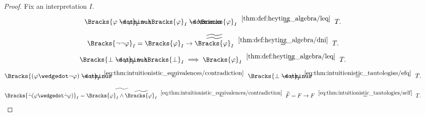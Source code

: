\begin{proof}
  Fix an interpretation \( I \).

  \begin{equation*}
    \Bracks{\varphi \synimplies \varphi}_I
    =
    \Bracks{\varphi}_I \synimplies \Bracks{\varphi}_I
    \reloset {\ref{thm:def:heyting_algebra/leq}} =
    T.
  \end{equation*}

  \begin{equation*}
    \Bracks{\neg \neg \varphi}_I
    =
    \Bracks{\varphi}_I \rightarrow \widetilde{\widetilde{\Bracks{\varphi}_I}}
    \reloset {\ref{thm:def:heyting_algebra/dni}} =
    T.
  \end{equation*}

  \begin{equation*}
    \Bracks{\bot \synimplies \varphi}_I
    =
    \Bracks{\bot}_I \implies \Bracks{\varphi}_I
    \reloset {\ref{thm:def:heyting_algebra/leq}} =
    T.
  \end{equation*}

  \begin{equation*}
    \Bracks{(\varphi \synwedge \neg \varphi) \synimplies \psi}_I
    \reloset {\eqref{eq:thm:intuitionistic_equivalences/contradiction}} =
    \Bracks{\bot \synimplies \psi}_I
    \reloset {\eqref{eq:thm:intuitionistic_tautologies/efq}} =
    T.
  \end{equation*}

  \begin{equation*}
    \Bracks{\synneg (\varphi \synwedge \synneg \varphi)}_I
    =
    \widetilde{\Bracks{\varphi}_I \wedge \widetilde{\Bracks{\varphi}_I}}
    \reloset {\eqref{eq:thm:intuitionistic_equivalences/contradiction}} =
    \widetilde{F}
    =
    F \rightarrow F
    \reloset {\eqref{eq:thm:intuitionistic_tautologies/self}} =
    T.
  \end{equation*}
\end{proof}

